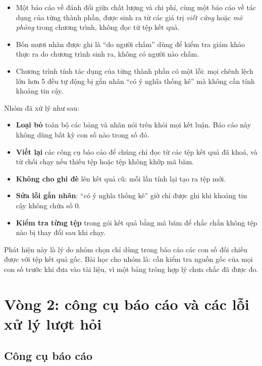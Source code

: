 \begin{itemize}
    \item Một báo cáo về đánh đổi giữa chất lượng và chi phí, cùng một báo cáo về tác dụng của từng thành phần, được sinh ra từ các giá trị \emph{viết cứng} hoặc \emph{mô phỏng} trong chương trình, không đọc từ tệp kết quả.
    \item Bốn mươi nhãn được ghi là ``do người chấm'' dùng để kiểm tra giám khảo thực ra do chương trình sinh ra, không có người nào chấm.
    \item Chương trình tính tác dụng của từng thành phần có một lỗi: mọi chênh lệch lớn hơn 5 \pp{} đều tự động bị gắn nhãn ``có ý nghĩa thống kê'' mà không cần tính khoảng tin cậy.
\end{itemize}

Nhóm đã xử lý như sau:

\begin{itemize}
    \item \textbf{Loại bỏ} toàn bộ các bảng và nhãn nói trên khỏi mọi kết luận. Báo cáo này không dùng bất kỳ con số nào trong số đó.
    \item \textbf{Viết lại} các công cụ báo cáo để chúng chỉ đọc từ các tệp kết quả đã khoá, và từ chối chạy nếu thiếu tệp hoặc tệp không khớp mã băm.
    \item \textbf{Không cho ghi đè} lên kết quả cũ: mỗi lần tính lại tạo ra tệp mới.
    \item \textbf{Sửa lỗi gắn nhãn}: ``có ý nghĩa thống kê'' giờ chỉ được ghi khi khoảng tin cậy không chứa số 0.
    \item \textbf{Kiểm tra từng tệp} trong gói kết quả bằng mã băm để chắc chắn không tệp nào bị thay đổi sau khi chạy.
\end{itemize}

Phát hiện này là lý do nhóm chọn chỉ dùng trong báo cáo các con số đối chiếu được với tệp kết quả gốc. Bài học cho nhóm là: cần kiểm tra nguồn gốc của mọi con số trước khi đưa vào tài liệu, vì một bảng trông hợp lý chưa chắc đã được đo.

\section{Vòng 2: công cụ báo cáo và các lỗi xử lý lượt hỏi}

\subsection{Công cụ báo cáo}

